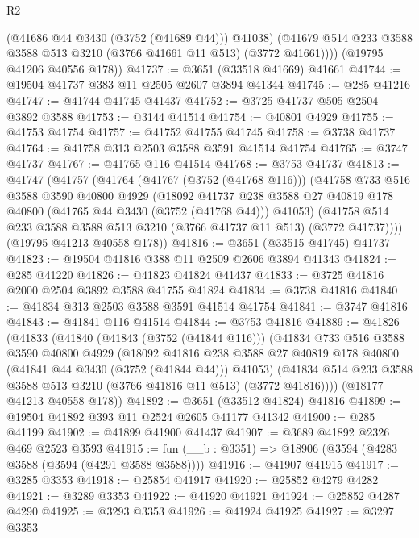 \begin{lexlean}{R2}
\begin{coremodule}
            (@41686 @44 @3430 (@3752 (@41689 @44)))
            @41038)
          (@41679 @514 @233 @3588 @3588 @513 @3210 (@3766 @41661 @11 @513) (@3772 @41661))))
      (@19795 @41206 @40556 @178))
@41737 := @3651 (@33518 @41669) @41661
@41744 := @19504 @41737 @383 @11 @2505 @2607 @3894 @41344
@41745 := @285 @41216
@41747 := @41744 @41745 @41437
@41752 := @3725 @41737 @505 @2504 @3892 @3588
@41753 := @3144 @41514
@41754 := @40801 @4929
@41755 := @41753 @41754
@41757 := @41752 @41755 @41745
@41758 := @3738 @41737
@41764 := @41758 @313 @2503 @3588 @3591 @41514 @41754
@41765 := @3747 @41737
@41767 := @41765 @116 @41514
@41768 := @3753 @41737
@41813 := @41747
    (@41757
      (@41764
        (@41767 (@3752 (@41768 @116)))
        (@41758
          @733
          @516
          @3588
          @3590
          @40800
          @4929
          (@18092
            @41737
            @238
            @3588
            @27
            @40819
            @178
            @40800
            (@41765 @44 @3430 (@3752 (@41768 @44)))
            @41053)
          (@41758 @514 @233 @3588 @3588 @513 @3210 (@3766 @41737 @11 @513) (@3772 @41737))))
      (@19795 @41213 @40558 @178))
@41816 := @3651 (@33515 @41745) @41737
@41823 := @19504 @41816 @388 @11 @2509 @2606 @3894 @41343
@41824 := @285 @41220
@41826 := @41823 @41824 @41437
@41833 := @3725 @41816 @2000 @2504 @3892 @3588 @41755 @41824
@41834 := @3738 @41816
@41840 := @41834 @313 @2503 @3588 @3591 @41514 @41754
@41841 := @3747 @41816
@41843 := @41841 @116 @41514
@41844 := @3753 @41816
@41889 := @41826
    (@41833
      (@41840
        (@41843 (@3752 (@41844 @116)))
        (@41834
          @733
          @516
          @3588
          @3590
          @40800
          @4929
          (@18092
            @41816
            @238
            @3588
            @27
            @40819
            @178
            @40800
            (@41841 @44 @3430 (@3752 (@41844 @44)))
            @41053)
          (@41834 @514 @233 @3588 @3588 @513 @3210 (@3766 @41816 @11 @513) (@3772 @41816))))
      (@18177 @41213 @40558 @178))
@41892 := @3651 (@33512 @41824) @41816
@41899 := @19504 @41892 @393 @11 @2524 @2605 @41177 @41342
@41900 := @285 @41199
@41902 := @41899 @41900 @41437
@41907 := @3689 @41892 @2326 @469 @2523 @3593
@41915 := fun (__b : @3351) => @18906 (@3594 (@4283 @3588 (@3594 (@4291 @3588 @3588))))
@41916 := @41907 @41915
@41917 := @3285 @3353
@41918 := @25854 @41917
@41920 := @25852 @4279 @4282
@41921 := @3289 @3353
@41922 := @41920 @41921
@41924 := @25852 @4287 @4290
@41925 := @3293 @3353
@41926 := @41924 @41925
@41927 := @3297 @3353

\end{coremodule}
\end{lexlean}

